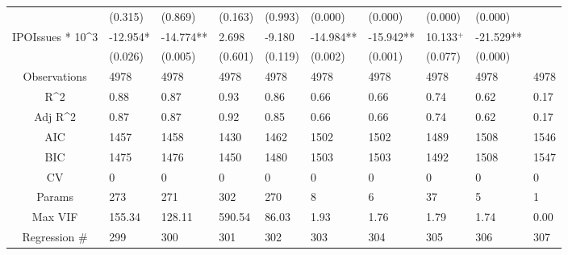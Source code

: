 \documentclass{article}
\begin{document}
\begin{table}[H]
\begin{tabular}{|clllllllll|}
   & (0.315) & (0.869) & (0.163) & (0.993) & (0.000) & (0.000) & (0.000) & (0.000) &  \\ 
  IPOIssues * 10^3 & -12.954* & -14.774** & 2.698 & -9.180 & -14.984** & -15.942** & 10.133$^{+}$ & -21.529** &  \\ 
   & (0.026) & (0.005) & (0.601) & (0.119) & (0.002) & (0.001) & (0.077) & (0.000) &  \\ 
  \hline 
 Observations & 4978 & 4978 & 4978 & 4978 & 4978 & 4978 & 4978 & 4978 & 4978 \\ 
  R^2 & 0.88 & 0.87 & 0.93 & 0.86 & 0.66 & 0.66 & 0.74 & 0.62 & 0.17 \\ 
  Adj R^2 & 0.87 & 0.87 & 0.92 & 0.85 & 0.66 & 0.66 & 0.74 & 0.62 & 0.17 \\ 
  AIC & 1457 & 1458 & 1430 & 1462 & 1502 & 1502 & 1489 & 1508 & 1546 \\ 
  BIC & 1475 & 1476 & 1450 & 1480 & 1503 & 1503 & 1492 & 1508 & 1547 \\ 
  CV & 0 & 0 & 0 & 0 & 0 & 0 & 0 & 0 & 0 \\ 
  Params & 273 & 271 & 302 & 270 & 8 & 6 & 37 & 5 & 1 \\ 
  Max VIF & 155.34 & 128.11 & 590.54 & 86.03 & 1.93 & 1.76 & 1.79 & 1.74 & 0.00 \\ 
  Regression \# & 299 & 300 & 301 & 302 & 303 & 304 & 305 & 306 & 307 \\ 
   \hline
\end{tabular}
 
\end{table}
\end{document}
